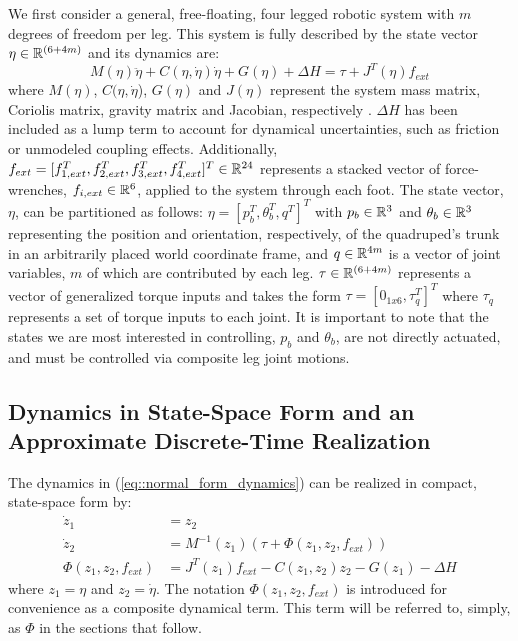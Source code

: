 
We first consider a general, free-floating, four legged robotic 
system with $m$ degrees of freedom per leg. This system is fully described by the state vector 
$\eta \in \mathbb{R}^{(6+4m)}$ and its dynamics are:
	\begin{equation}
		M(\eta)\ddot{\eta} + C(\eta,\dot{\eta})\dot{\eta} + G(\eta) + \Delta{H} = \tau + J^T(\eta) f_{ext} %
		\label{eq::normal_form_dynamics}
	\end{equation}
where $M(\eta)$, $C(\eta,\dot{\eta}$), $G(\eta)$ and $J(\eta)$ represent the system mass matrix, 
Coriolis matrix, gravity matrix and Jacobian, respectively \cite{Wieber2006}. $\Delta{H}$ 
has been included as a lump term to account for dynamical uncertainties, such as friction or 
unmodeled coupling effects. Additionally, $f_{ext} = [ f_{1,ext}^{T},f_{2,ext}^{T},f_{3,ext}^{T},f_{4,ext}^{T}]^{T} \in \mathbb{R}^{24}$ 
represents a stacked vector of force-wrenches, $f_{i,ext} \in \mathbb{R}^{6}$, applied to the system through each \Ith foot.
The state vector, $\eta$, can be partitioned as follows: 
$\eta = [ p_{b}^{T}, \theta_{b}^{T}, q^{T} ]^{T}$ with $p_{b} \in \mathbb{R}^{3}$ and $\theta_{b} \in \mathbb{R}^{3}$ 
representing the position and orientation, respectively, of the quadruped's trunk in an arbitrarily placed 
world coordinate frame, and $q \in \mathbb{R}^{4 m}$ is a vector of joint variables, $m$ of which are contributed by 
each leg.
$\tau \in \mathbb{R}^{(6+4m)}$ represents a vector of generalized torque inputs and takes the form 
$\tau = [ 0_{1x6}, \tau_{q}^{T} ]^{T}$ where $\tau_{q}$ represents a set of torque inputs to each joint. 
It is important to note that the states we are most interested in controlling, $p_{b}$ and 
$\theta_{b}$, are not directly actuated, and must be controlled via composite leg joint motions.


\subsection{Dynamics in State-Space Form and an Approximate Discrete-Time Realization}
%
%
The dynamics in (\ref{eq::normal_form_dynamics}) can be realized in compact, state-space form by:
	\begin{equation}
		\begin{split}
		\dot{z}_{1} 				&= z_{2} \\
		\dot{z}_{2} 				&= M^{-1}(z_{1})(\tau + \Phi(z_{1},z_{2},f_{ext})) \\
		\Phi(z_{1},z_{2},f_{ext}) 	&= J^T(z_{1}) f_{ext} - C(z_{1},z_{2})z_{2} - G(z_{1}) - \Delta{H}
		\end{split}
		\label{eq::state_space_dynamics}
	\end{equation}
where $z_{1}=\eta$ and $z_{2}=\dot{\eta}$. The notation $\Phi(z_{1},z_{2},f_{ext})$ is introduced
for convenience as a composite dynamical term. This term will be referred to, simply, as $\Phi$ in the sections that 
follow.

